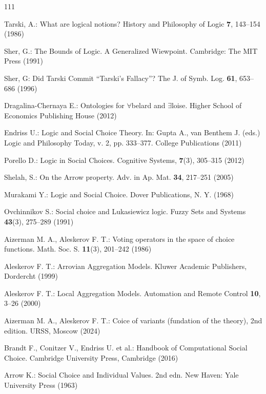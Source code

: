 \documentclass[graybox]{SNmult}
\theoremstyle{definition}
\begin{document}
%

\begin{thebibliography}{111}
	
	Tarski, A.: What are logical notions? History and Philosophy of Logic \textbf{7}, 143--154 (1986)
	
	 Sher, G.: The Bounds of Logic. A Generalized Wiewpoint. Cambridge: The MIT Press (1991)
	
	 Sher, G: Did Tarski Commit ``Tarski's Fallacy''? The J. of Symb. Log. \textbf{61}, 653--686 (1996)
	
	 Dragalina-Chernaya E.: Ontologies for $\forall$belard and $\exists$loise. Higher School of Economics Publishing House (2012)
	
	 Endriss U.: Logic and Social Choice Theory. In: Gupta A.,  van Benthem J. (eds.) Logic and Philosophy Today, v. 2, pp. 333--377. College Publications (2011)
		
	
	 Porello D.: Logic in Social Choices. Cognitive Systems, \textbf{7}(3), 305--315 (2012)
	
			
	Shelah, S.: On the Arrow property. Adv. in Ap. Mat. \textbf{34}, 217--251 (2005)
	
	  Murakami Y.: Logic and Social Choice. Dover Publications, N. Y. (1968)
	
		  Ovchinnikov S.: Social choice and Lukasiewicz logic. Fuzzy Sets and Systems \textbf{43}(3), 275--289 (1991)
		
		Aizerman M. A., Aleskerov F. T.: Voting operators in the space of choice
		functions. Math. Soc. S. \textbf{11}(3), 201--242 (1986)
		
		Aleskerov F. T.: Arrovian Aggregation Models. Kluwer Academic Publishers, Dordercht  (1999)
		
		Aleskerov F. T.: Local Aggregation Models. Automation and Remote Control \textbf{10}, 3--26 (2000)
		
		 Aizerman M. A., Aleskerov F. T.: Coice of variants (fundation of the theory), 2nd edition. URSS, Moscow (2024)
		
		 Brandt F., Conitzer V., Endriss U. et
		al.: Handbook of Computational Social Choice. Cambridge University Press, Cambridge (2016)
		
		Arrow K.: Social Choice and Individual Values. 2nd edn. New Haven: Yale University Press (1963)
		

\end{thebibliography}
\end{document}

